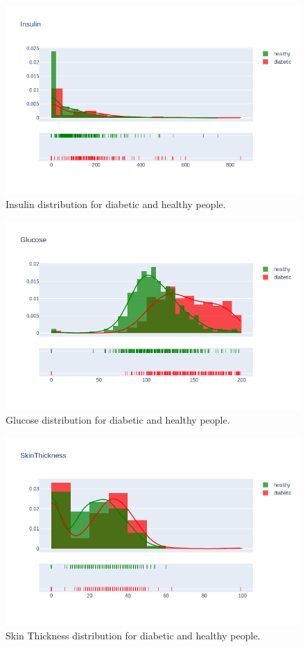 \documentclass[12pt]{article}
\begin{document}
\begin{figure}[ht]
\centering
\includegraphics[width=1\textwidth]{newplot(4).png}
\caption{Insulin distribution for diabetic and healthy people.}
\end{figure}

\begin{figure}[ht]
\centering
\includegraphics[width=1\textwidth]{newplot(5).png}
\caption{Glucose distribution for diabetic and healthy people.}
\end{figure}

\begin{figure}[ht]
\centering
\includegraphics[width=1\textwidth]{newplot(6).png}
\caption{Skin Thickness distribution for diabetic and healthy people.}
\end{figure}
\end{document}
